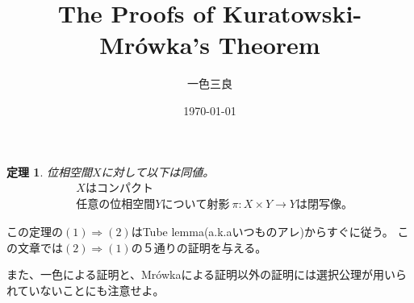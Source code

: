 \documentclass[leqno]{jsarticle}
\title{The Proofs of Kuratowski-Mr\'owka's Theorem}
\author{一色三良}
\date{\today}
\newtheorem{thm}{定理}
\newcommand{\To}{\Longrightarrow}
\begin{document}
\maketitle

\begin{thm}\label{sugoi}
位相空間$X$に対して以下は同値。
\begin{eqnarray}
&Xはコンパクト\\ 
&任意の位相空間Yについて射影\ \pi: X\times Y\to Yは閉写像。
\end{eqnarray}
\end{thm}
この定理の$(1)\To(2)$はTube lemma(a.k.aいつものアレ)からすぐに従う。
この文章では$(2)\To(1)$の５通りの証明を与える。\par
また、一色による証明と、Mr\'owkaによる証明以外の証明には選択公理が用いられていないことにも注意せよ。

\end{document}
